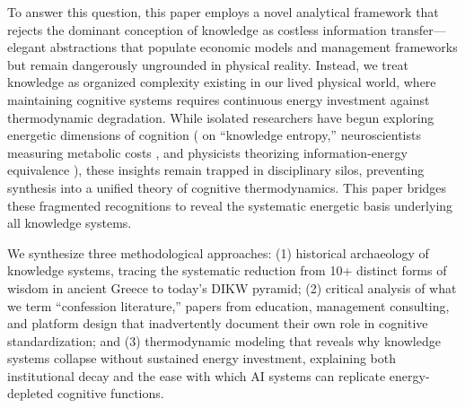 To answer this question, this paper employs a novel analytical framework that rejects the dominant conception of knowledge as costless information transfer---elegant abstractions that populate economic models and management frameworks but remain dangerously ungrounded in physical reality. Instead, we treat knowledge as organized complexity existing in our lived physical world, where maintaining cognitive systems requires continuous energy investment against thermodynamic degradation. While isolated researchers have begun exploring energetic dimensions of cognition (\citet{bratianu2020} on ``knowledge entropy,'' neuroscientists measuring metabolic costs \citep{jamadar2025}, and physicists theorizing information-energy equivalence \citep{stonier1996}), these insights remain trapped in disciplinary silos, preventing synthesis into a unified theory of cognitive thermodynamics. This paper bridges these fragmented recognitions to reveal the systematic energetic basis underlying all knowledge systems.

We synthesize three methodological approaches: (1) historical archaeology of knowledge systems, tracing the systematic reduction from 10+ distinct forms of wisdom in ancient Greece to today's DIKW pyramid; (2) critical analysis of what we term ``confession literature,'' papers from education, management consulting, and platform design that inadvertently document their own role in cognitive standardization; and (3) thermodynamic modeling that reveals why knowledge systems collapse without sustained energy investment, explaining both institutional decay and the ease with which AI systems can replicate energy-depleted cognitive functions.

